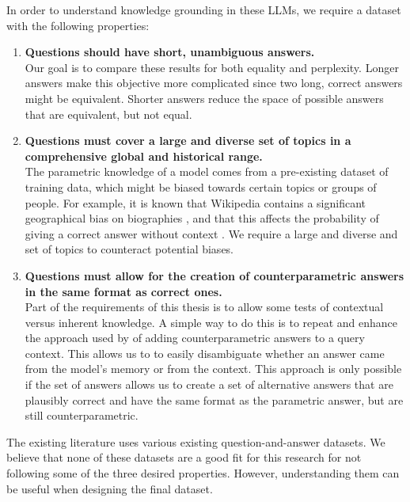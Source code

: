 In order to understand knowledge grounding in these LLMs, we require a dataset with the following properties:
\begin{enumerate}
	\item \textbf{Questions should have short, unambiguous answers.} \\
		Our goal is to compare these results for both equality and perplexity. Longer answers make this objective more complicated since two long, correct answers might be equivalent. Shorter answers reduce the space of possible answers that are equivalent, but not equal.
	\item \textbf{Questions must cover a large and diverse set of topics in a comprehensive global and historical range.} \\
	    The parametric knowledge of a model comes from a pre-existing dataset of training data, which might be biased towards certain topics or groups of people. For example, it is known that Wikipedia contains a significant geographical bias on biographies \citep{wikipedia_geographic_bias}, and that this affects the probability of giving a correct answer without context \citep{factual_recall}.
		We require a large and diverse and set of topics to counteract potential biases.
	\item \textbf{Questions must allow for the creation of counterparametric answers in the same format as correct ones.} \\
		Part of the requirements of this thesis is to allow some tests of contextual versus inherent knowledge.
	    A simple way to do this is to repeat and enhance the approach used by \citeauthor{factual_recall} of adding counterparametric answers to a query context.
		This allows us to to easily disambiguate whether an answer came from the model's memory or from the context.
	    This approach is only possible if the set of answers allows us to create a set of alternative answers that are plausibly correct and have the same format as the parametric answer, but are still counterparametric.
\end{enumerate}

The existing literature uses various existing question-and-answer datasets.
We believe that none of these datasets are a good fit for this research for not following some of the three desired properties.
However, understanding them can be useful when designing the final dataset.

